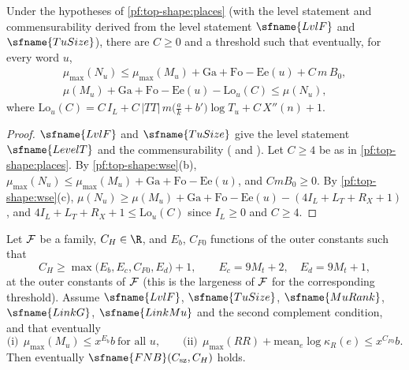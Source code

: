 \begin{corollary}\label{pf:top-shape:slopelemma}
Under the hypotheses of \cref{pf:top-shape:places} (with the level statement and commensurability derived from the
level statement $\sfname{LvlF}$ and $\sfname{TuSize}$), there are $C\ge0$ and a threshold such that eventually, for
every word $u$,
\begin{gather*}
\mu_{\max}(N_u)\le\mu_{\max}(M_u)+\mathrm{Ga}+\mathrm{Fo}-\mathrm{Ee}(u)+C\,m\,B_0,\\
\mu(M_u)+\mathrm{Ga}+\mathrm{Fo}-\mathrm{Ee}(u)-\mathrm{Lo}_u(C)\le\mu(N_u),
\end{gather*}
where $\mathrm{Lo}_u(C)=C\,I_L+C\,|TT|\,m\bigl(\frac ak+b'\bigr)\log T_u+C\,X''(n)+1$.
\end{corollary}

\begin{proof}
$\sfname{LvlF}$ and $\sfname{TuSize}$ give the level statement $\sfname{LevelT}$ and the commensurability
( and ). Let
$C\ge4$ be as in \cref{pf:top-shape:places}. By \cref{pf:top-shape:wse}(b), $\mu_{\max}(N_u)\le\mu_{\max}(M_u)+
\mathrm{Ga}+\mathrm{Fo}-\mathrm{Ee}(u)$, and $CmB_0\ge0$. By \cref{pf:top-shape:wse}(c),
$\mu(N_u)\ge\mu(M_u)+\mathrm{Ga}+\mathrm{Fo}-\mathrm{Ee}(u)-(4I_L+L_T+R_X+1)$, and
$4I_L+L_T+R_X+1\le\mathrm{Lo}_u(C)$ since $I_L\ge0$ and $C\ge4$.
\end{proof}

\begin{theorem}\label{pf:top-shape:hh}
Let $\mathcal{F}$ be a family, $C_H\in\R$, and $E_b$, $C_{F0}$ functions of the outer constants such that
\[
C_H\ge\max\bigl(E_b,E_c,C_{F0},E_d\bigr)+1,\qquad E_c=9M_t+2,\quad E_d=9M_t+1,
\]
at the outer constants of $\mathcal{F}$ (this is the largeness of $\mathcal{F}$ for the corresponding threshold).
Assume $\sfname{LvlF}$, $\sfname{TuSize}$, $\sfname{MuRank}$, $\sfname{LinkG}$, $\sfname{LinkMu}$ and the second
complement condition, and that eventually
\[
\text{(i)}\ \ \mu_{\max}(M_u)\le x^{E_b}b\ \text{for all }u,\qquad
\text{(ii)}\ \ \mu_{\max}(\mathit{RR})+\mathrm{mean}_e\log\kappa_R(e)\le x^{C_{F0}}b .
\]
Then eventually $\sfname{FNB}(C_{\rm sz},C_H)$ holds.
\end{theorem}

